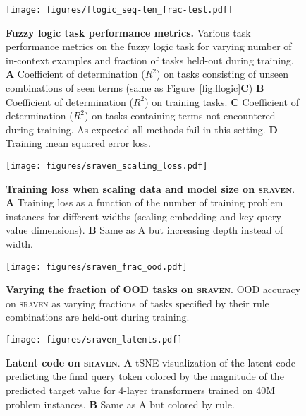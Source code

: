 \documentclass{article} \usepackage{iclr2025,times}
\begin{document}
\begin{figure}
    \centering
    \texttt{[image: figures/flogic\_seq-len\_frac-test.pdf]}
    \caption{\textbf{Fuzzy logic task performance metrics.} Various task performance metrics on the fuzzy logic task for varying number of in-context examples and fraction of tasks held-out during training. \textbf{A} Coefficient of determination ($R^2$) on tasks consisting of unseen combinations of seen terms (same as Figure~\ref{fig:flogic}\textbf{C})
    \textbf{B} Coefficient of determination ($R^2$) on training tasks.
    \textbf{C} Coefficient of determination ($R^2$) on tasks containing terms not encountered during training. As expected all methods fail in this setting. \textbf{D} Training mean squared error loss.}
    \label{appfig:flogic-seq-len-frac-test}
\end{figure}


\begin{figure}[t]
    \centering
    \texttt{[image: figures/sraven\_scaling\_loss.pdf]}
    \caption{\textbf{Training loss when scaling data and model size on \textsc{sraven}}. \textbf{A} Training loss as a function of the number of training problem instances for different widths (scaling embedding and key-query-value dimensions). \textbf{B} Same as A but increasing depth instead of width.}
    \label{fig:sraven-scaling-loss}
\end{figure}

\begin{figure}[t]
    \centering
    
    \texttt{[image: figures/sraven\_frac\_ood.pdf]}
    \captionsetup{width=0.4\linewidth}
    \caption{\textbf{Varying the fraction of OOD tasks on \textsc{sraven}}. OOD accuracy on \textsc{sraven} as varying fractions of tasks specified by their rule combinations are held-out during training.}
    \label{fig:sraven-frac-ood}
\end{figure}

\begin{figure}[t]
    \centering
    \texttt{[image: figures/sraven\_latents.pdf]}
    \caption{\textbf{Latent code on \textsc{sraven}}. \textbf{A} tSNE visualization of the latent code predicting the final query token colored by the magnitude of the predicted target value for 4-layer transformers trained on 40M problem instances. \textbf{B} Same as A but colored by rule.}
    \label{appfig:sraven-latents}
\end{figure}
\end{document}
